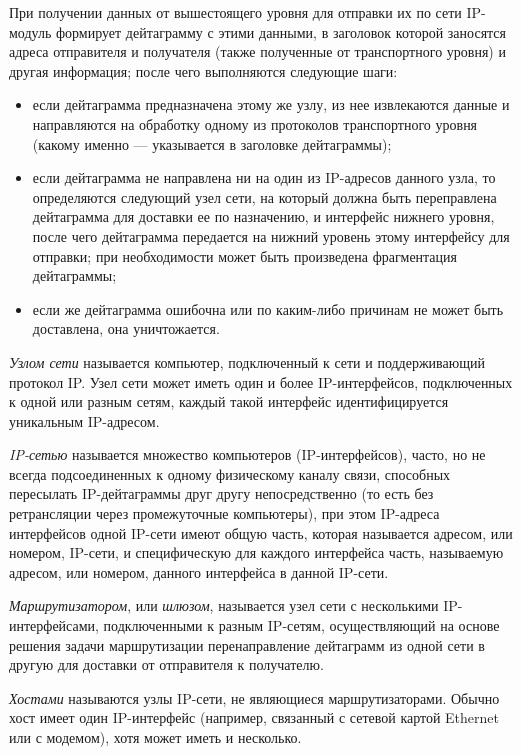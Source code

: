 При получении данных от вышестоящего уровня для отправки их по сети IP-модуль
формирует дейтаграмму с этими данными, в заголовок которой заносятся
адреса отправителя и получателя (также полученные от транспортного уровня)
и другая информация; после чего выполняются следующие шаги:
\begin{itemize}
  \item если дейтаграмма предназначена этому же узлу, из нее извлекаются данные
    и направляются на обработку одному из протоколов транспортного
    уровня (какому именно --- указывается в заголовке дейтаграммы);
  \item если дейтаграмма не направлена ни на один из IP-адресов данного узла,
    то определяются следующий узел сети, на который должна быть переправлена
    дейтаграмма для доставки ее по назначению, и интерфейс нижнего уровня,
    после чего дейтаграмма передается на нижний уровень этому интерфейсу для отправки;
    при необходимости может быть произведена фрагментация дейтаграммы;
  \item если же дейтаграмма ошибочна или по каким-либо причинам не может быть доставлена, она уничтожается.
\end{itemize}

\textit{Узлом сети} называется компьютер, подключенный к сети и поддерживающий
протокол IP. Узел сети может иметь один и более IP-интерфейсов, подключенных
к одной или разным сетям, каждый такой интерфейс идентифицируется уникальным IP-адресом.

\textit{IP-сетью} называется множество компьютеров (IP-интерфейсов), часто,
но не всегда подсоединенных к одному физическому каналу связи, способных
пересылать IP-дейтаграммы друг другу непосредственно (то есть без ретрансляции
через промежуточные компьютеры), при этом IP-адреса интерфейсов одной IP-сети
имеют общую часть, которая называется адресом, или номером, IP-сети,
и специфическую для каждого интерфейса часть, называемую адресом, или номером,
данного интерфейса в данной IP-сети.

\textit{Маршрутизатором}, или \textit{шлюзом}, называется узел сети с
несколькими IP-интерфейсами, подключенными к разным IP-сетям,
осуществляющий на основе решения задачи маршрутизации перенаправление
дейтаграмм из одной сети в другую для доставки от отправителя к получателю.

\textit{Хостами} называются узлы IP-сети, не являющиеся маршрутизаторами.
Обычно хост имеет один IP-интерфейс (например, связанный с сетевой картой
Ethernet или с модемом), хотя может иметь и несколько.
